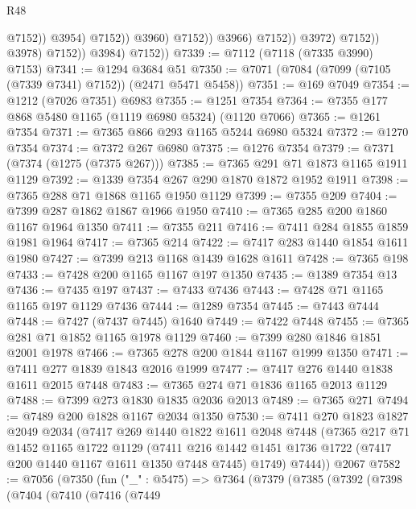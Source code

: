 \begin{lexlean}{R48}
\begin{coremodule}
                                            @7152))
                                        @3954)
                                      @7152))
                                  @3960)
                                @7152))
                            @3966)
                          @7152))
                      @3972)
                    @7152))
                @3978)
              @7152))
          @3984)
        @7152))
@7339 := @7112 (@7118 (@7335 @3990) @7153)
@7341 := @1294 @3684 @51
@7350 := @7071 (@7084 (@7099 (@7105 (@7339 @7341) @7152)) (@2471 @5471 @5458))
@7351 := @169 @7049
@7354 := @1212 (@7026 @7351) @6983
@7355 := @1251 @7354
@7364 := @7355 @177 @868 @5480 @1165 (@1119 @6980 @5324) (@1120 @7066)
@7365 := @1261 @7354
@7371 := @7365 @866 @293 @1165 @5244 @6980 @5324
@7372 := @1270 @7354
@7374 := @7372 @267 @6980
@7375 := @1276 @7354
@7379 := @7371 (@7374 (@1275 (@7375 @267)))
@7385 := @7365 @291 @71 @1873 @1165 @1911 @1129
@7392 := @1339 @7354 @267 @290 @1870 @1872 @1952 @1911
@7398 := @7365 @288 @71 @1868 @1165 @1950 @1129
@7399 := @7355 @209
@7404 := @7399 @287 @1862 @1867 @1966 @1950
@7410 := @7365 @285 @200 @1860 @1167 @1964 @1350
@7411 := @7355 @211
@7416 := @7411 @284 @1855 @1859 @1981 @1964
@7417 := @7365 @214
@7422 := @7417 @283 @1440 @1854 @1611 @1980
@7427 := @7399 @213 @1168 @1439 @1628 @1611
@7428 := @7365 @198
@7433 := @7428 @200 @1165 @1167 @197 @1350
@7435 := @1389 @7354 @13
@7436 := @7435 @197
@7437 := @7433 @7436
@7443 := @7428 @71 @1165 @1165 @197 @1129 @7436
@7444 := @1289 @7354
@7445 := @7443 @7444
@7448 := @7427 (@7437 @7445) @1640
@7449 := @7422 @7448
@7455 := @7365 @281 @71 @1852 @1165 @1978 @1129
@7460 := @7399 @280 @1846 @1851 @2001 @1978
@7466 := @7365 @278 @200 @1844 @1167 @1999 @1350
@7471 := @7411 @277 @1839 @1843 @2016 @1999
@7477 := @7417 @276 @1440 @1838 @1611 @2015 @7448
@7483 := @7365 @274 @71 @1836 @1165 @2013 @1129
@7488 := @7399 @273 @1830 @1835 @2036 @2013
@7489 := @7365 @271
@7494 := @7489 @200 @1828 @1167 @2034 @1350
@7530 := @7411
    @270
    @1823
    @1827
    @2049
    @2034
    (@7417
      @269
      @1440
      @1822
      @1611
      @2048
      @7448
      (@7365
        @217
        @71
        @1452
        @1165
        @1722
        @1129
        (@7411 @216 @1442 @1451 @1736 @1722 (@7417 @200 @1440 @1167 @1611 @1350 @7448 @7445) @1749)
        @7444))
    @2067
@7582 := @7056
    (@7350
      (fun ("_" : @5475) =>
      @7364
        (@7379
          (@7385
            (@7392
              (@7398
                (@7404
                  (@7410
                    (@7416
                      (@7449

\end{coremodule}
\end{lexlean}
